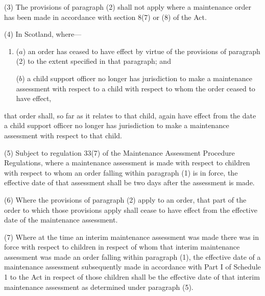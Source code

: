 \documentclass[a4paper]{article}
\begin{document}
(3) The provisions of paragraph (2) shall not apply where a maintenance order has been made in accordance with section 8(7) or (8) of the Act.

(4) In Scotland, where—
\begin{enumerate}\item[]
($a$) an order has ceased to have effect by virtue of the provisions of paragraph (2) to the extent specified in that paragraph; and

($b$) a child support officer no longer has jurisdiction to make a maintenance assessment with respect to a child with respect to whom the order ceased to have effect,
\end{enumerate}
that order shall, so far as it relates to that child, again have effect from the date a child support officer no longer has jurisdiction to make a maintenance assessment with respect to that child.

(5) 
Subject to regulation 33(7) of the Maintenance Assessment Procedure Regulations,  %
where a maintenance assessment is made with respect to children with respect to whom an order falling within paragraph (1) is in force, the effective date of that assessment shall be two days after the assessment is made.

(6) Where the provisions of paragraph (2) apply to an order, that part of the order to which those provisions apply shall cease to have effect from the effective date of the maintenance assessment.

(7) Where at the time an interim maintenance assessment was made there was in force with respect to children in respect of whom that interim maintenance assessment was made an order falling within paragraph (1), the effective date of a maintenance assessment subsequently made in accordance with Part I of Schedule 1 to the Act in respect of those children shall be the effective date of that interim maintenance assessment as determined under paragraph (5).
\end{document}
